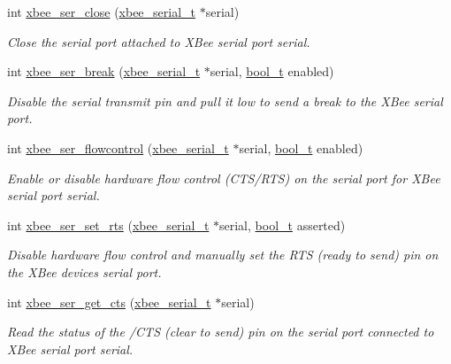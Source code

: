 \begin{DoxyCompactItemize}
int \hyperlink{group__hal__kl25_ga48b9d743a446074ea6abacd0de24044d}{xbee\+\_\+ser\+\_\+close} (\hyperlink{structxbee__serial__t}{xbee\+\_\+serial\+\_\+t} $\ast$serial)
\begin{DoxyCompactList}\small\item\em Close the serial port attached to X\+Bee serial port {\itshape serial}. \end{DoxyCompactList}\item 
int \hyperlink{group__hal__kl25_gae19aa61eec588d1b935d267b0a982319}{xbee\+\_\+ser\+\_\+break} (\hyperlink{structxbee__serial__t}{xbee\+\_\+serial\+\_\+t} $\ast$serial, \hyperlink{group__hal__dos_ga04dd5074964518403bf944f2b240a5f8}{bool\+\_\+t} enabled)
\begin{DoxyCompactList}\small\item\em Disable the serial transmit pin and pull it low to send a break to the X\+Bee serial port. \end{DoxyCompactList}\item 
int \hyperlink{group__hal__kl25_ga33229d0d63ff1442f23b0739794d3afb}{xbee\+\_\+ser\+\_\+flowcontrol} (\hyperlink{structxbee__serial__t}{xbee\+\_\+serial\+\_\+t} $\ast$serial, \hyperlink{group__hal__dos_ga04dd5074964518403bf944f2b240a5f8}{bool\+\_\+t} enabled)
\begin{DoxyCompactList}\small\item\em Enable or disable hardware flow control (C\+T\+S/\+R\+TS) on the serial port for X\+Bee serial port {\itshape serial}. \end{DoxyCompactList}\item 
int \hyperlink{group__hal__kl25_gad1b1f9f42e58d8299ddcca1c9cb3c5e8}{xbee\+\_\+ser\+\_\+set\+\_\+rts} (\hyperlink{structxbee__serial__t}{xbee\+\_\+serial\+\_\+t} $\ast$serial, \hyperlink{group__hal__dos_ga04dd5074964518403bf944f2b240a5f8}{bool\+\_\+t} asserted)
\begin{DoxyCompactList}\small\item\em Disable hardware flow control and manually set the R\+TS (ready to send) pin on the X\+Bee device\textquotesingle{}s serial port. \end{DoxyCompactList}\item 
int \hyperlink{group__hal__kl25_ga894f6fadc890b5ba5ce32338f0acd217}{xbee\+\_\+ser\+\_\+get\+\_\+cts} (\hyperlink{structxbee__serial__t}{xbee\+\_\+serial\+\_\+t} $\ast$serial)
\begin{DoxyCompactList}\small\item\em Read the status of the /\+C\+TS (clear to send) pin on the serial port connected to X\+Bee serial port {\itshape serial}. \end{DoxyCompactList}\item 

\end{DoxyCompactItemize}
